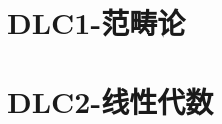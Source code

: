 \documentclass{plainbook}
\begin{document}


\part{DLC1-范畴论}


\part{DLC2-线性代数}


















% 

% 

% 

% 

% 

% 



\end{document}
